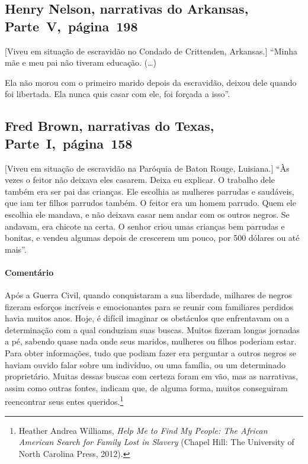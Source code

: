 \subsection{Henry Nelson, narrativas do Arkansas, Parte~V,~página~198}

{[}Viveu em situação de escravidão no Condado de Crittenden, Arkansas.{]} ``Minha mãe e meu pai não tiveram educação. (\ldots{})

Ela não morou com o primeiro marido depois da escravidão, deixou dele
quando foi libertada. Ela nunca quis casar com ele, foi forçada a isso''.

\subsection{Fred Brown, narrativas do Texas, Parte~I,~página~158} \label{ref36}

{[}Viveu em situação de escravidão na Paróquia de Baton Rouge, Luisiana.{]} ``Às vezes o feitor não deixava eles casarem. Deixa eu explicar. O
trabalho dele também era ser pai das crianças. Ele escolhia as mulheres
parrudas e saudáveis, que iam ter filhos parrudos também. O feitor era
um homem parrudo. Quem ele escolhia ele mandava, e não deixava casar nem
andar com os outros negros. Se andavam, era chicote na certa. O senhor
criou umas crianças bem parrudas e bonitas, e vendeu algumas depois de
crescerem um pouco, por 500 dólares ou até mais''.

\paragraph{Comentário}\quad
{\small
Após a Guerra Civil, quando conquistaram a sua
liberdade, milhares de negros fizeram esforços incríveis e emocionantes para se
reunir com familiares perdidos havia muitos anos. Hoje, é difícil
imaginar os obstáculos que enfrentavam ou a determinação com a qual
conduziam suas buscas. Muitos fizeram longas jornadas a pé, sabendo
quase nada onde seus maridos, mulheres ou filhos poderiam estar. Para
obter informações, tudo que podiam fazer era perguntar a outros negros
se haviam ouvido falar sobre um indivíduo, ou uma família, ou um
determinado proprietário. Muitas dessas buscas com certeza foram em vão,
mas as narrativas, assim como outras fontes, indicam que, de alguma
forma, muitos conseguiram reencontrar seus entes
queridos.\footnote{Heather Andrea Williams, \emph{Help Me to Find My
  People: The African American Search for Family Lost in Slavery}
  (Chapel Hill: The University of North Carolina Press, 2012).}
}

